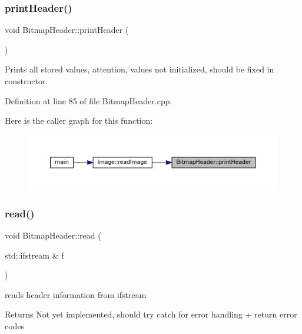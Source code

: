 \subsubsection{\texorpdfstring{printHeader()}{printHeader()}}
{\footnotesize\ttfamily void Bitmap\+Header\+::print\+Header (\begin{DoxyParamCaption}{ }\end{DoxyParamCaption})}



Prints all stored values, attention, values not initialized, should be fixed in constructor. 



Definition at line 85 of file Bitmap\+Header.\+cpp.

Here is the caller graph for this function\+:
\nopagebreak
\begin{figure}[H]
\begin{center}
\leavevmode
\includegraphics[width=350pt]{classBitmapHeader_a72e26bdf3269d382dfbdc76119c1a6aa_icgraph}
\end{center}
\end{figure}
\mbox{\label{classBitmapHeader_a6f91559c339074535445780e99e5f717}} 
\subsubsection{\texorpdfstring{read()}{read()}}
{\footnotesize\ttfamily void Bitmap\+Header\+::read (\begin{DoxyParamCaption}\item[{std\+::ifstream \&}]{f }\end{DoxyParamCaption})\hspace{0.3cm}{\ttfamily [private]}}



reads header information from ifstream 

\begin{DoxyReturn}{Returns}
Not yet implemented, should try catch for error handling + return error codes 
\end{DoxyReturn}


